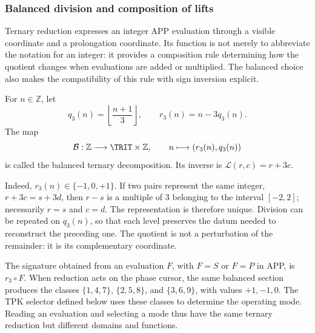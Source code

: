 \subsubsection{Balanced division and composition of lifts}
\label{trit-ampl-div-balanceada}

Ternary reduction expresses an integer APP evaluation through a
visible coordinate and a prolongation coordinate. Its function is not
merely to abbreviate the notation for an integer: it provides a composition
rule determining how the quotient changes when evaluations are added or
multiplied. The balanced choice also makes the compatibility of this rule
with sign inversion explicit.

\begin{definition}
\label{trit-ampl-def-coordenadas}
For \(n\in\mathbb Z\), let
\[
 q_3(n)=\left\lfloor\frac{n+1}{3}\right\rfloor,\qquad
 r_3(n)=n-3q_3(n).
\]
The map
\[
 \mathcal B:\mathbb Z\longrightarrow\TRIT\times\mathbb Z,\qquad
 n\longmapsto(r_3(n),q_3(n))
\]
is called the balanced ternary decomposition. Its inverse is
\(\mathcal L(r,c)=r+3c\).
\end{definition}

Indeed, \(r_3(n)\in\{-1,0,+1\}\). If two pairs represent the same integer,
\(r+3c=s+3d\), then \(r-s\) is a multiple of \(3\) belonging to the interval
\([-2,2]\); necessarily \(r=s\) and \(c=d\). The representation is therefore
unique. Division can be repeated on \(q_3(n)\), so that each level
preserves the datum needed to reconstruct the preceding one. The quotient is not a
perturbation of the remainder: it is its complementary coordinate.

The signature obtained from an evaluation \(F\), with \(F=S\) or \(F=P\) in APP,
is \(r_3\circ F\). When reduction acts on the phase cursor, the same
balanced section produces the classes \(\{1,4,7\}\), \(\{2,5,8\}\), and
\(\{3,6,9\}\), with values \(+1,-1,0\). The TPK selector defined
below uses these classes to determine the operating mode.
Reading an evaluation and selecting a mode thus have the same
ternary reduction but different domains and functions.

